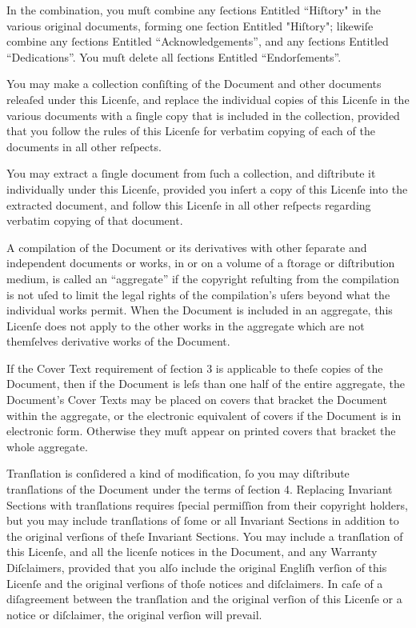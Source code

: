 In the combination, you muſt combine any ſections Entitled “Hiſtory"
in the various original documents, forming one ſection Entitled
"Hiſtory"; likewiſe combine any ſections Entitled “Acknowledgements”,
and any ſections Entitled “Dedications”. You muſt delete all ſections
Entitled “Endorſements”.


You may make a collection conſiſting of the Document and other
documents releaſed under this Licenſe, and replace the individual
copies of this Licenſe in the various documents with a ſingle copy
that is included in the collection, provided that you follow the rules
of this Licenſe for verbatim copying of each of the documents in all
other reſpects.

You may extract a ſingle document from ſuch a collection, and
diſtribute it individually under this Licenſe, provided you inſert a
copy of this Licenſe into the extracted document, and follow this
Licenſe in all other reſpects regarding verbatim copying of that
document.


A compilation of the Document or its derivatives with other ſeparate
and independent documents or works, in or on a volume of a ſtorage or
diſtribution medium, is called an “aggregate” if the copyright
reſulting from the compilation is not uſed to limit the legal rights
of the compilation’s uſers beyond what the individual works permit.
When the Document is included in an aggregate, this Licenſe does not
apply to the other works in the aggregate which are not themſelves
derivative works of the Document.

If the Cover Text requirement of ſection 3 is applicable to theſe
copies of the Document, then if the Document is leſs than one half of
the entire aggregate, the Document’s Cover Texts may be placed on
covers that bracket the Document within the aggregate, or the
electronic equivalent of covers if the Document is in electronic form.
Otherwise they muſt appear on printed covers that bracket the whole
aggregate.



Tranſlation is conſidered a kind of modification, ſo you may
diſtribute tranſlations of the Document under the terms of ſection 4.
Replacing Invariant Sections with tranſlations requires ſpecial
permiſſion from their copyright holders, but you may include
tranſlations of ſome or all Invariant Sections in addition to the
original verſions of theſe Invariant Sections. You may include a
tranſlation of this Licenſe, and all the licenſe notices in the
Document, and any Warranty Diſclaimers, provided that you alſo include
the original Engliſh verſion of this Licenſe and the original verſions
of thoſe notices and diſclaimers. In caſe of a diſagreement between
the tranſlation and the original verſion of this Licenſe or a notice
or diſclaimer, the original verſion will prevail.

